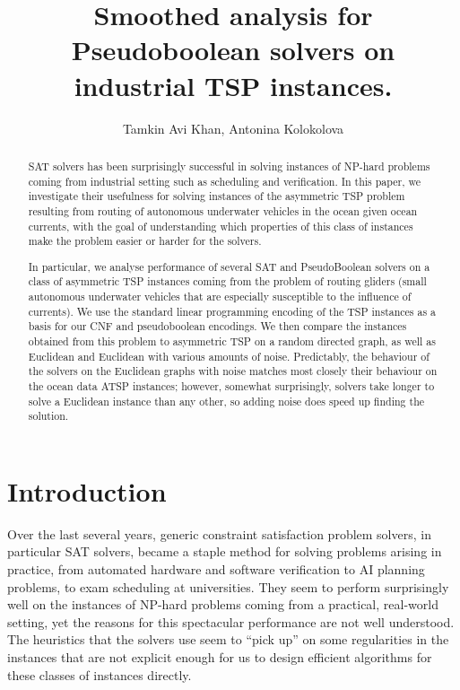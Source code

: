 \documentclass{llncs}
\begin{document}
\title{Smoothed analysis for Pseudoboolean solvers on industrial TSP instances.}
\author{Tamkin Avi Khan, 
Antonina Kolokolova}

\maketitle

\begin{abstract}
SAT solvers has been surprisingly successful in solving instances of NP-hard problems coming from industrial setting such as scheduling and verification. In this paper, we investigate their usefulness for solving instances of the asymmetric TSP problem resulting from routing of autonomous underwater vehicles in the ocean given ocean currents, with the goal of understanding which properties of this class of  instances make the problem easier or harder for the solvers. 

In particular, we analyse performance of several SAT and PseudoBoolean solvers on a class of asymmetric TSP instances coming from the problem of routing gliders (small autonomous underwater vehicles that are especially susceptible to the influence of currents). We use the standard linear programming encoding of the TSP instances \cite{MTZ60} as a basis for our CNF and pseudoboolean encodings. We then compare the instances obtained from this problem to asymmetric TSP on a random directed graph, as well as Euclidean and Euclidean with various amounts of noise. Predictably, the behaviour of the solvers on the Euclidean graphs with noise matches most closely their behaviour on the ocean data ATSP instances; however, somewhat  surprisingly, solvers take longer to solve a Euclidean instance than any other, so adding noise does speed up finding the solution.   
\end{abstract}

\section{Introduction}

Over the last several years, generic constraint satisfaction problem solvers, in particular SAT
solvers, became a staple method for solving problems arising in practice, from automated hardware and software verification to AI planning problems, to exam scheduling at
universities.  They seem to perform surprisingly well on the instances of NP-hard problems coming from a practical, real-world setting, yet the reasons for this spectacular performance are not well understood. The heuristics that the solvers use  seem to ``pick up'' on some regularities in the instances that are not explicit enough for us to design efficient algorithms for these classes of instances directly.   
\end{document}
